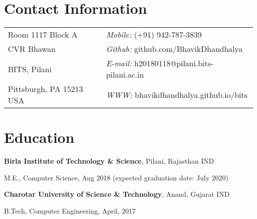 \documentclass[margin,line]{res}
\newenvironment{list1}{
  \begin{list}{\ding{113}}{%
      \setlength{\itemsep}{0in}
      \setlength{\parsep}{0in} \setlength{\parskip}{0in}
      \setlength{\topsep}{0in} \setlength{\partopsep}{0in} 
      \setlength{\leftmargin}{0.17in}}}{\end{list}}
\begin{document}

\begin{resume}
\section{\sc Contact Information}
\vspace{.05in}
\begin{tabular}{@{}p{2in}p{4in}}
Room 1117 Block A             & {\it Mobile:}  (+91) 942-787-3839 \\            
CVR Bhawan   & {\it Github:}    github.com/BhavikDhandhalya \\         
BITS, Pilani & {\it E-mail:}  h20180118@pilani.bits-pilani.ac.in\\
Pittsburgh, PA  15213 USA  & {\it WWW:} bhavikdhandhalya.github.io/bits \\     
\end{tabular}



\section{\sc Education}
{\bf Birla Institute of Technology \& Science}, Pilani, Rajasthan IND\\
\vspace*{-.1in}
\begin{list1}
\item[] M.E., Computer Science, Aug 2018 (expected
  graduation date: July 2020)
\vspace*{.05in}
\end{list1}

{\bf Charotar University of Science \& Technology}, Anand, Gujarat IND\\
\vspace*{-.1in}
\begin{list1}
\item[] B.Tech, Computer Engineering,  April, 2017
\end{list1}

%


\end{resume}
\end{document}
